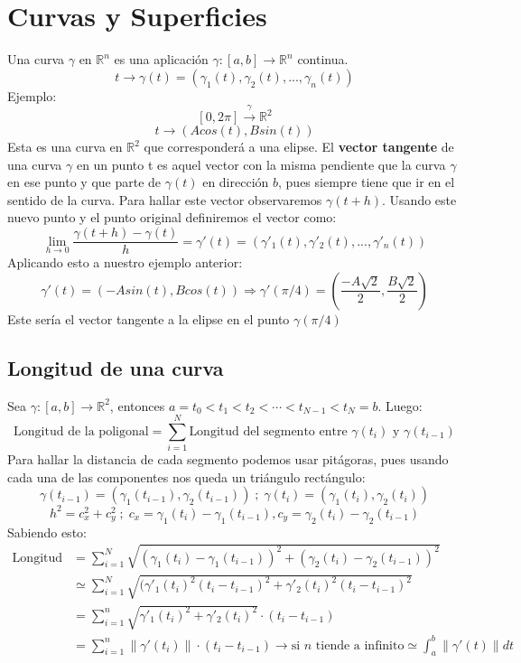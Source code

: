 \documentclass[11pt]{article}
\providecommand{\norm}[1]{\left\lVert #1 \right \rVert}
\providecommand{\norm}[1]{\left\lVert #1 \right \rVert}
\newcommand{\R}{\mathbb{R}}
\theoremstyle{plain}
\begin{document}
    \section{Curvas y Superficies} %
    \label{sec:curvas_y_superficies}
        Una curva $\gamma$ en $\R^n$ es una aplicación $\gamma:[a,b] \rightarrow \R^n$ continua.
        \[t \rightarrow \gamma(t) = (\gamma_1(t), \gamma_2(t),...,\gamma_n(t))\]
        Ejemplo:
        \[[0,2\pi] \xrightarrow{\gamma} \R^2\]
        \[t \rightarrow (Acos(t), Bsin(t))\]
        Esta es una curva en $\R^2$ que corresponderá a una elipse. El \textbf{vector tangente} de una curva $\gamma$ en un punto t es aquel vector con la misma pendiente que la curva $\gamma$ en ese punto y que parte de $\gamma(t)$ en dirección $b$, pues siempre tiene que ir en el sentido de la curva. Para hallar este vector observaremos $\gamma(t+h)$. Usando este nuevo punto y el punto original definiremos el vector como:\[\lim_{h\to 0} \frac{\gamma(t+h)-\gamma(t)}{h} = \gamma'(t) =(\gamma'_1(t), \gamma'_2(t),...,\gamma'_n(t))\]
        Aplicando esto a nuestro ejemplo anterior:
        \[\gamma'(t) = (-Asin(t),Bcos(t)) \Rightarrow \gamma'(\pi/4) = (\frac{-A\sqrt{2}}{2},\frac{B\sqrt{2}}{2})\]
        Este sería el vector tangente a la elipse en el punto $\gamma(\pi/4)$
        \subsection{Longitud de una curva} %
        \label{sub:longitud_de_una_curva}
            Sea $\gamma:[a,b] \rightarrow \R^2$, entonces $a = t_0 < t_1 < t_2 < \cdots < t_{N-1} < t_N = b$. Luego:
            \[\text{Longitud de la poligonal} = \sum_{i=1}^{N} \text{Longitud del segmento entre $\gamma(t_i)$ y $\gamma(t_{i-1})$} \]
            Para hallar la distancia de cada segmento podemos usar pitágoras, pues usando cada una de las componentes nos queda un triángulo rectángulo:
            \[\gamma(t_{i-1}) = (\gamma_1(t_{i-1}), \gamma_2(t_{i-1}))\; ; \; \gamma(t_{i}) = (\gamma_1(t_{i}), \gamma_2(t_{i}))\]
            \[h^2 = c_x^2 + c_y^2 \; ; \; c_x = \gamma_1(t_{i}) - \gamma_1(t_{i-1}), c_y = \gamma_2(t_{i}) - \gamma_2(t_{i-1}) \]
            Sabiendo esto:
            \begin{align}
                \text{Longitud de la poligonal} & = \sum_{i=1}^{N} \sqrt{(\gamma_1(t_{i}) - \gamma_1(t_{i-1}))^2 + (\gamma_2(t_{i}) - \gamma_2(t_{i-1}))^2}\\
                & \simeq \sum_{i=1}^{N} \sqrt{(\gamma'_1(t_{i})^2(t_i - t_{i-1})^2 + \gamma'_2(t_{i})^2(t_i - t_{i-1})^2}\\
                & = \sum_{i=1}^{n} \sqrt{\gamma'_1(t_{i})^2 + \gamma'_2(t_{i})^2}\cdot (t_i - t_{i-1})\\
                & = \sum_{i=1}^{n} \norm{\gamma'(t_i)}\cdot(t_i-t_{i-1})\rightarrow \text{si $n$ tiende a infinito} \simeq \int_{a}^{b} \norm{\gamma'(t)} dt
            \end{align}
\end{document}
